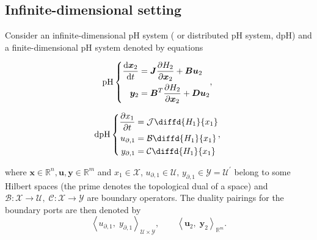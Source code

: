 \documentclass[letterpaper, 10 pt, conference]{ieeeconf}
\begin{document}
\subsection{Infinite-dimensional setting}
Consider an infinite-dimensional pH system ( or distributed pH system, dpH) and a finite-dimensional pH system denoted by equations 

\noindent
\begin{minipage}{.5\linewidth}
	\begin{equation}
	\text{pH} \left\{ 
	\begin{aligned}
	\diff{\bm{x}_2}{t} &= \bm{J} \diffp{H_2}{\bm{x}_2} + \bm{B} \bm{u}_2 \\
	\bm{y}_{2} &= \bm{B}^T \diffp{H_2}{\bm{x}_2} + \bm{D} \bm{u}_2 \\
	\end{aligned},
	\right. 
	\end{equation}
\end{minipage} %
\begin{minipage}{.45\linewidth}
	\begin{equation}
	\text{dpH} \left\{ 
	\begin{aligned}
	\diffp{x_1}{t} &= \mathcal{J} \diffd{H_1}{x_1} \\
	u_{\partial, 1}  &= \mathcal{B} \diffd{H_1}{x_1} \\
	y_{\partial, 1} &= \mathcal{C} \diffd{H_1}{x_1} \\
	\end{aligned},
	\right.
	\end{equation} 
\end{minipage}

where $\bm{x} \in \mathbb{R}^n, \bm{u}, \bm{y} \in \mathbb{R}^m$ and $x_1 \in \mathscr{X}$,  $u_{\partial, 1}  \in \mathscr{U}, \, y_{\partial, 1} \in  \mathscr{Y} = \mathscr{U}^\prime$ belong to some Hilbert spaces (the prime denotes the topological dual of a space)  and  $\mathcal{B}: \mathscr{X} \rightarrow \mathscr{U}, \; \mathcal{C}: \mathscr{X} \rightarrow \mathscr{Y}$ are boundary operators. The duality pairings for the boundary ports are then denoted by
\[
\left\langle u_{\partial, 1}, \; y_{\partial, 1} \right\rangle_{\mathscr{U} \times \mathscr{Y}},  \qquad
\left\langle \bm{u}_{2}, \; \bm{y}_{2} \right\rangle_{\mathbb{R}^m}.
\]
\end{document}
